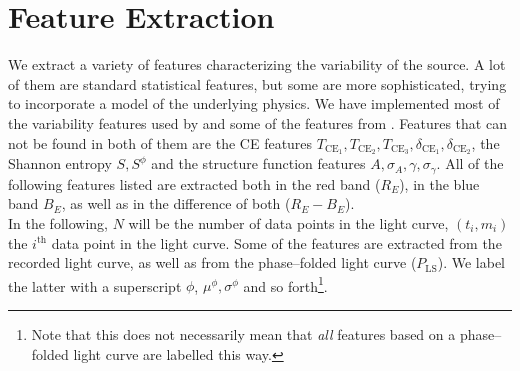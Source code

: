 
\section{Feature Extraction}

We extract a variety of features characterizing the variability of the source. A lot of them are standard statistical features, but some are more sophisticated, trying to incorporate a model of the underlying physics. We have implemented most of the variability features used by \citet{kim2014} and some of the features from \citet{dubath2011}. Features that can not be found in both of them are the CE features $T_{\text{CE}_1}, T_{\text{CE}_2}, T_{\text{CE}_3}, \delta_{\text{CE}_1}, \delta_{\text{CE}_2}$, the Shannon entropy $S, S^\phi$ and the structure function features $A, \sigma_A, \gamma, \sigma_\gamma$. All of the following features listed are extracted both in the red band ($R_E$), in the blue band $B_E$, as well as in the difference of both ($R_E - B_E$).\\

In the following, $N$ will be the number of data points in the light curve, $(t_i, m_i)$ the $i^{\text{th}}$ data point in the light curve. Some of the features are extracted from the recorded light curve, as well as from the phase--folded light curve ($P_{\text{LS}}$). We label the latter with a superscript $\phi$, \eg $\mu^\phi, \sigma^\phi$ and so forth\footnote{Note that this does not necessarily mean that \emph{all} features based on a phase--folded light curve are labelled this way.}.

